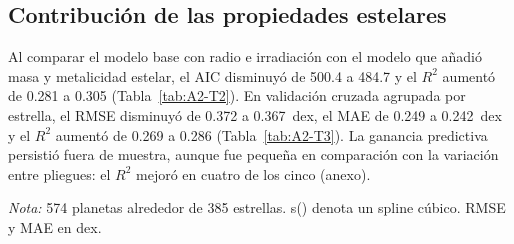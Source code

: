 \subsection{Contribución de las propiedades estelares}
\label{sec:res-contribucion-estelar}

Al comparar el modelo base con radio e irradiación con el modelo que añadió masa y metalicidad estelar, el AIC disminuyó de 500.4 a 484.7 y el $R^2$ aumentó de 0.281 a 0.305 (Tabla~\ref{tab:A2-T2}). En validación cruzada agrupada por estrella, el RMSE disminuyó de 0.372 a 0.367~dex, el MAE de 0.249 a 0.242~dex y el $R^2$ aumentó de 0.269 a 0.286 (Tabla~\ref{tab:A2-T3}). La ganancia predictiva persistió fuera de muestra, aunque fue pequeña en comparación con la variación entre pliegues: el $R^2$ mejoró en cuatro de los cinco (anexo).

\begin{table}[htbp]
    \centering
    \caption{Análisis II: comparación de los modelos de la masa planetaria en la muestra de ajuste. Diferencias respecto al modelo base M1.}
    \label{tab:A2-T2}
    \small
    \par\smallskip
    {\footnotesize\textit{Nota:} 574 planetas alrededor de 385 estrellas. s() denota un spline cúbico. RMSE y MAE en dex.}
\end{table}

